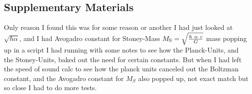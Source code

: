 \begin{multicols}{2}
%

\setcounter{table}{0}
\renewcommand{\thetable}{S\arabic{table}}%
\setcounter{figure}{0}
\renewcommand{\thefigure}{S\arabic{figure}}%
\subsection*{Supplementary Materials}
Only reason I found this was for some reason or another I had just looked at $\sqrt{\hbar \alpha}$, and I had Avogadro constant for Stoney-Mass $M_{{\text{S}}} = \sqrt{\hbar ~ \alpha ~c \over G}$ mass popping up in a script I had running with some notes to see how the Planck-Units, and the Stoney-Units\citep{Stoney1883}, baked out the need for certain constants. But when I had left the speed of sound calc to see how the planck units canceled out the Boltzman constant, and the Avogadro constant for $M_S$ also popped up, not exact match but so close I had to do more tests.%

\end{multicols}

